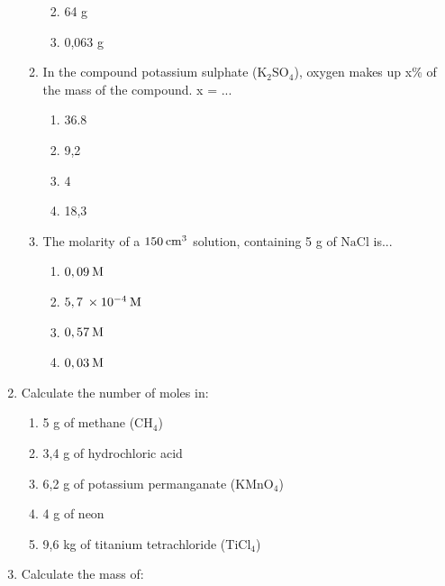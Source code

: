 \begin{enumerate}[noitemsep, label=\textbf{\arabic*}. ]
\begin{enumerate}[noitemsep, label=\textbf{\alph*}. ]
\begin{enumerate}[noitemsep, label=\textbf{\alph*}. ]
\label{m38712*uid135}\item 64 g
\label{m38712*uid136}\item 0,063 g
\end{enumerate}
                \label{m38712*uid137}\item In the compound potassium sulphate ($\mathrm{K}{}_{2}\mathrm{SO}{}_{4}$), oxygen makes up x\% of the mass of the compound. x = ...
\label{m38712*id286432}\begin{enumerate}[noitemsep, label=\textbf{\alph*}. ] 
            \label{m38712*uid138}\item 36.8
\label{m38712*uid139}\item 9,2
\label{m38712*uid140}\item 4
\label{m38712*uid141}\item 18,3
\end{enumerate}
                \label{m38712*uid142}\item The molarity of a $150\phantom{\rule{2pt}{0ex}}{\mathrm{cm}}^{3}$ solution, containing 5 g of $\mathrm{NaCl}$ is...
\label{m38712*id286512}\begin{enumerate}[noitemsep, label=\textbf{\alph*}. ] 
            \label{m38712*uid143}\item $0,09\phantom{\rule{2pt}{0ex}}\mathrm{M}$
\label{m38712*uid144}\item $5,7\phantom{\rule{2pt}{0ex}}\ensuremath{\times}10{}^{-4}\phantom{\rule{2pt}{0ex}}\mathrm{M}$
\label{m38712*uid145}\item $0,57\phantom{\rule{2pt}{0ex}}\mathrm{M}$
\label{m38712*uid146}\item $0,03\phantom{\rule{2pt}{0ex}}\mathrm{M}$
\end{enumerate}
                \end{enumerate}
        \item Calculate the number of moles in:
\label{m38712*id6342}\begin{enumerate}[noitemsep, label=\textbf{\alph*}. ] 
            \item 5 g of methane (${\mathrm{CH}}_{4}$)\item 3,4 g of hydrochloric acid\item 6,2 g of potassium permanganate (${\mathrm{KMnO}}_{4}$)\item 4 g of neon\item 9,6 kg of titanium tetrachloride (${\mathrm{TiCl}}_{4}$)\end{enumerate}
        \item Calculate the mass of:\label{m38712*id7342}\begin{enumerate}[noitemsep, label=\textbf{\alph*}. ] 

\end{enumerate}
\end{enumerate}

